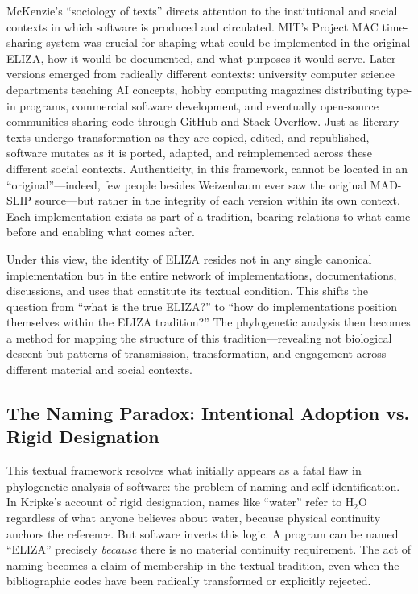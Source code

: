 \documentclass{article}
\begin{document}
McKenzie's ``sociology of texts'' \cite{mckenzie1999bibliography} directs attention to the institutional and social contexts in which software is produced and circulated. MIT's Project MAC time-sharing system was crucial for shaping what could be implemented in the original ELIZA, how it would be documented, and what purposes it would serve. Later versions emerged from radically different contexts: university computer science departments teaching AI concepts, hobby computing magazines distributing type-in programs, commercial software development, and eventually open-source communities sharing code through GitHub and Stack Overflow. Just as literary texts undergo transformation as they are copied, edited, and republished, software mutates as it is ported, adapted, and reimplemented across these different social contexts. Authenticity, in this framework, cannot be located in an ``original''—indeed, few people besides Weizenbaum ever saw the original MAD-SLIP source—but rather in the integrity of each version within its own context. Each implementation exists as part of a tradition, bearing relations to what came before and enabling what comes after.

Under this view, the identity of ELIZA resides not in any single canonical implementation but in the entire network of implementations, documentations, discussions, and uses that constitute its textual condition. This shifts the question from ``what is the true ELIZA?'' to ``how do implementations position themselves within the ELIZA tradition?'' The phylogenetic analysis then becomes a method for mapping the structure of this tradition—revealing not biological descent but patterns of transmission, transformation, and engagement across different material and social contexts.

\subsection{The Naming Paradox: Intentional Adoption vs. Rigid Designation}

This textual framework resolves what initially appears as a fatal flaw in phylogenetic analysis of software: the problem of naming and self-identification. In Kripke's account of rigid designation, names like ``water'' refer to H$_2$O regardless of what anyone believes about water, because physical continuity anchors the reference. But software inverts this logic. A program can be named ``ELIZA'' precisely \emph{because} there is no material continuity requirement. The act of naming becomes a claim of membership in the textual tradition, even when the bibliographic codes have been radically transformed or explicitly rejected.
\end{document}

